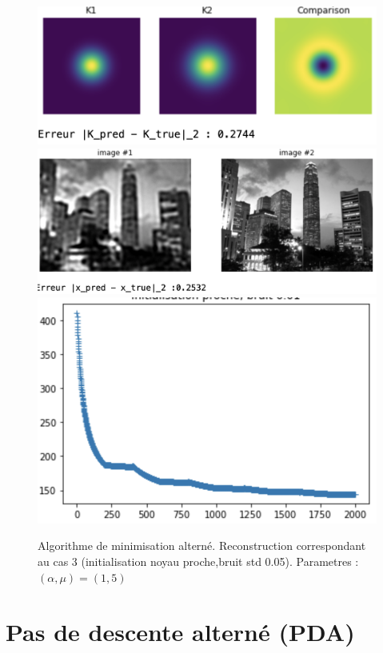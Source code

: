 \documentclass[a4paper]{article}
\begin{document}
\begin{figure}[h]
\includegraphics[scale=0.8]{figures/altrn-cas3-kernel}
\includegraphics[scale=0.6]{figures/altrn-cas3-image}
\includegraphics[scale=0.6]{figures/altrn-cas3-energy}
\caption{Algorithme de minimisation alterné. Reconstruction correspondant au cas 3  (initialisation noyau proche,bruit std 0.05). Parametres : $(\alpha,\mu) =(1,5)$}
\end{figure}

\section{Pas de descente alterné (PDA)}
%
\end{document}
